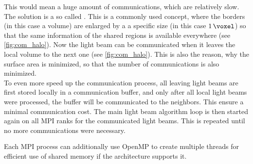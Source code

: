 %
This would mean a huge amount of communications, which are relatively slow.
The solution is a so called .
This is a commonly used concept, where the borders (in this case a volume) are enlarged by a a specific size (in this case $\SI{1}{\voxel}$) so that the same information of the shared regions is available everywhere (see \cref{fig:com_halo}).
%
Now the light beam can be communicated when it leaves the local volume to the next one (see \cref{fig:com_halo}).
This is also the reason, why the surface area is minimized, so that the number of communications is also minimized.
\\
To even more speed up the communication process, all leaving light beams are first stored locally in a communication buffer, and only after all local light beams were processed, the buffer will be communicated to the neighbors.
This ensure a minimal communication cost.
The main light beam algorithm loop is then started again on all \ac{MPI} ranks for the communicated light beams.
This is repeated until no more communications were necessary.
\par
%
Each \ac{MPI} process can additionally use \ac{OpenMP} to create multiple threads for efficient use of shared memory if the architecture supports it.
% 
%